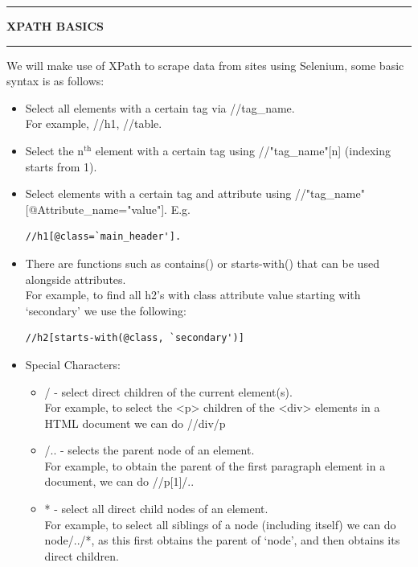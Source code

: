 \documentclass[8pt]{extarticle}
\newcommand{\heading}[1]{%
    \noindent
    \rule{\linewidth}{0.4pt}
    \begin{center}
        \vspace{-1ex}
        \textbf{#1}        
        \vspace{-2.5ex}
    \end{center}
    \rule{\linewidth}{0.4pt}
}
\begin{document}
\begin{multicols}{3}
\setlength{\columnseprule}{1pt} %

\heading{XPATH BASICS}

We will make use of XPath to scrape data from sites using Selenium, some basic syntax is as follows:

\begin{itemize}
    \item Select all elements with a certain tag via //tag\_name. \\    
    For example, //h1, //table.
    \item Select the n$^{\text{th}}$ element with a certain tag using //"tag\_name"[n] (indexing starts from 1).
    \item Select elements with a certain tag and attribute using //"tag\_name"[@Attribute\_name="value"]. E.g.
    \begin{lstlisting}[style=html]   
    //h1[@class=`main_header'].
    \end{lstlisting}
    \item There are functions such as contains() or starts-with() that can be used alongside attributes. \\
    For example, to find all h2's with class attribute value starting with `secondary' we use the following:
    \begin{lstlisting}[style=html]   
    //h2[starts-with(@class, `secondary')]
    \end{lstlisting}
    \item Special Characters:
    \begin{itemize}
        \item / - select direct children of the current element(s). \\
        For example, to select the <p> children of the <div> elements in a HTML document we can do //div/p
        \item /.. - selects the parent node of an element. \\
        For example, to obtain the parent of the first paragraph element in a document, we can do //p[1]/..
        \item * - select all direct child nodes of an element. \\
        For example, to select all siblings of a node (including itself) we can do node/../*, as this first obtains the parent of `node', and then obtains its direct children.
    \end{itemize}
\end{itemize}



\end{multicols}
\end{document}
